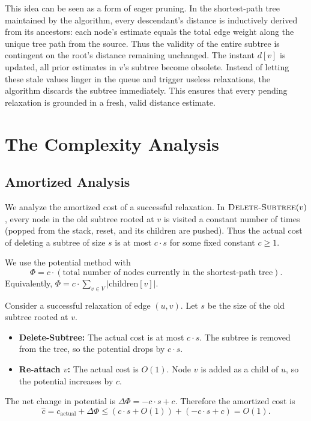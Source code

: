 \documentclass[a4paper]{article}
\theoremstyle{definition}
\begin{document}
This idea can be seen as a form of eager pruning. In the shortest-path tree maintained by the algorithm, every descendant's distance is inductively derived from its ancestors: each node's estimate equals the total edge weight along the unique tree path from the source. Thus the validity of the entire subtree is contingent on the root's distance remaining unchanged. The instant $d[v]$ is updated, all prior estimates in $v$'s subtree become obsolete. Instead of letting these stale values linger in the queue and trigger useless relaxations, the algorithm discards the subtree immediately. This ensures that every pending relaxation is grounded in a fresh, valid distance estimate.

\section{The Complexity Analysis}

\subsection{Amortized Analysis}

We analyze the amortized cost of a successful relaxation. In $\textsc{Delete-Subtree}(v)$, every node in the old subtree rooted at $v$ is visited a constant number of times (popped from the stack, reset, and its children are pushed). Thus the actual cost of deleting a subtree of size $s$ is at most $c \cdot s$ for some fixed constant $c \geq 1$.

We use the potential method with
\[
    \Phi = c \cdot (\text{total number of nodes currently in the shortest-path tree}).
\]
Equivalently, $\Phi = c \cdot \sum_{v \in V} |\text{children}[v]|$.

Consider a successful relaxation of edge $(u,v)$. Let $s$ be the size of the old subtree rooted at $v$.
\begin{itemize}
    \item \textbf{Delete-Subtree:} The actual cost is at most $c \cdot s$. The subtree is removed from the tree, so the potential drops by $c \cdot s$.
    \item \textbf{Re-attach $v$:} The actual cost is $O(1)$. Node $v$ is added as a child of $u$, so the potential increases by $c$.
\end{itemize}

The net change in potential is $\Delta\Phi = -c \cdot s + c$. Therefore the amortized cost is
\[
    \hat{c} = c_{\text{actual}} + \Delta\Phi \leq (c \cdot s + O(1)) + (-c \cdot s + c) = O(1).
\]
\end{document}
